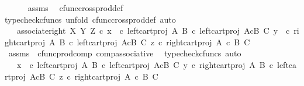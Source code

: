 \begin{isabellebody}
\ \ \ \ \isamarkupfalse%
\ assms\ \isamarkupfalse%
\ cfunc{\isacharunderscore}{\kern0pt}cross{\isacharunderscore}{\kern0pt}prod{\isacharunderscore}{\kern0pt}def{}\ \isamarkupfalse%
{\isacharparenleft}{\kern0pt}typecheck{\isacharunderscore}{\kern0pt}cfuncs{\isacharcomma}{\kern0pt}\ unfold\ cfunc{\isacharunderscore}{\kern0pt}cross{\isacharunderscore}{\kern0pt}prod{\isacharunderscore}{\kern0pt}def{}{\isacharcomma}{\kern0pt}\ auto{\isacharparenright}{\kern0pt}\ \isanewline
\ \ \isamarkupfalse%
\ \isamarkupfalse%
\ {\isachardoublequoteopen}{\isachardot}{\kern0pt}{\isachardot}{\kern0pt}{\isachardot}{\kern0pt}\ {\isacharequal}{\kern0pt}\ associate{\isacharunderscore}{\kern0pt}right\ X\ Y\ Z\ {\isasymcirc}\isactrlsub c\ {\isasymlangle}{\isasymlangle}x\ \ {\isasymcirc}\isactrlsub c\ left{\isacharunderscore}{\kern0pt}cart{\isacharunderscore}{\kern0pt}proj\ A\ B\ {\isasymcirc}\isactrlsub c\ left{\isacharunderscore}{\kern0pt}cart{\isacharunderscore}{\kern0pt}proj\ {\isacharparenleft}{\kern0pt}A{\isasymtimes}\isactrlsub cB{\isacharparenright}{\kern0pt}\ C{\isacharcomma}{\kern0pt}\ y\ \ {\isasymcirc}\isactrlsub c\ right{\isacharunderscore}{\kern0pt}cart{\isacharunderscore}{\kern0pt}proj\ A\ B\ {\isasymcirc}\isactrlsub c\ left{\isacharunderscore}{\kern0pt}cart{\isacharunderscore}{\kern0pt}proj\ {\isacharparenleft}{\kern0pt}A{\isasymtimes}\isactrlsub cB{\isacharparenright}{\kern0pt}\ C{\isasymrangle}{\isacharcomma}{\kern0pt}\ z\ {\isasymcirc}\isactrlsub c\ right{\isacharunderscore}{\kern0pt}cart{\isacharunderscore}{\kern0pt}proj\ {\isacharparenleft}{\kern0pt}A\ {\isasymtimes}\isactrlsub c\ B{\isacharparenright}{\kern0pt}\ C{\isasymrangle}{\isachardoublequoteclose}\isanewline
\ \ \ \ \isamarkupfalse%
\ assms\ \ cfunc{\isacharunderscore}{\kern0pt}prod{\isacharunderscore}{\kern0pt}comp\ comp{\isacharunderscore}{\kern0pt}associative{}\ \isamarkupfalse%
\ {\isacharparenleft}{\kern0pt}typecheck{\isacharunderscore}{\kern0pt}cfuncs{\isacharcomma}{\kern0pt}\ auto{\isacharparenright}{\kern0pt}\isanewline
\ \ \isamarkupfalse%
\ \isamarkupfalse%
\ {\isachardoublequoteopen}{\isachardot}{\kern0pt}{\isachardot}{\kern0pt}{\isachardot}{\kern0pt}\ {\isacharequal}{\kern0pt}\ {\isasymlangle}x\ \ {\isasymcirc}\isactrlsub c\ left{\isacharunderscore}{\kern0pt}cart{\isacharunderscore}{\kern0pt}proj\ A\ B\ {\isasymcirc}\isactrlsub c\ left{\isacharunderscore}{\kern0pt}cart{\isacharunderscore}{\kern0pt}proj\ {\isacharparenleft}{\kern0pt}A{\isasymtimes}\isactrlsub cB{\isacharparenright}{\kern0pt}\ C{\isacharcomma}{\kern0pt}\ {\isasymlangle}y\ {\isasymcirc}\isactrlsub c\ right{\isacharunderscore}{\kern0pt}cart{\isacharunderscore}{\kern0pt}proj\ A\ B\ {\isasymcirc}\isactrlsub c\ left{\isacharunderscore}{\kern0pt}cart{\isacharunderscore}{\kern0pt}proj\ {\isacharparenleft}{\kern0pt}A{\isasymtimes}\isactrlsub cB{\isacharparenright}{\kern0pt}\ C{\isacharcomma}{\kern0pt}\ z\ {\isasymcirc}\isactrlsub c\ right{\isacharunderscore}{\kern0pt}cart{\isacharunderscore}{\kern0pt}proj\ {\isacharparenleft}{\kern0pt}A\ {\isasymtimes}\isactrlsub c\ B{\isacharparenright}{\kern0pt}\ C{\isasymrangle}{\isasymrangle}{\isachardoublequoteclose}\isanewline

\end{isabellebody}
